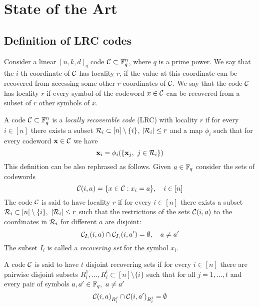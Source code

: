 \chapter{State of the Art}

\section{Definition of LRC codes}

Consider a linear $[n,k,d]_q$ code ${\mathcal C} \subset {\mathbb F}_q^n$, where $q$ is a prime power. We say that the $i$-th coordinate of ${\mathcal C}$ has locality $r$, if the value at this coordinate can be recovered from accessing some other $r$ coordinates of ${\mathcal C}$. We say that the code ${\mathcal C}$ has locality $r$ if every symbol of the codeword $x \in {\mathcal C}$ can be recovered from a subset of $r$ other symbols of $x$.

\begin{defn}
A code ${\mathcal C} \subset {\mathbb F}_q^n$ is a \textit{locally recoverable code} (LRC) with locality $r$ if for every $i \in [n]$ there exists a subset ${\mathcal R}_i \subset [n] \setminus \{i\}$, $\left\vert {{\mathcal R}_i} \right\vert \leq r$ and a map $\phi_i$ such that for every codeword $\mathbf{x} \in {\mathcal C}$ we have
\begin{equation}
\x_i = \phi_i(\{\x_j, \ j \in \R_i \})
\end{equation}
This definition can be also rephrased as follows. Given $a \in {\mathbb F}_q$ consider the sets of codewords
\[{\mathcal C}(i,a) = \{ x \in {\mathcal C} : x_i = a\}, \quad i \in [n]\]
The code ${\mathcal C}$ is said to have locality $r$ if for every $i \in [n]$ there exists a subset ${{\mathcal R}_i \subset [n] \setminus \{i\}}, \ \left\vert {{\mathcal R}_i} \right\vert \leq r$ such that the restrictions of the sets ${\mathcal C}(i,a)$ to the coordinates in ${\mathcal R}_i$ for different $a$ are disjoint:
    \begin{equation}
        {\mathcal C}_{I_i}(i,a) \cap {\mathcal C}_{I_i}(i,a') = \emptyset, \quad a \neq a'
    \end{equation}
The subset $I_i$ is called a \textit{recovering set} for the symbol $x_i$.
\end{defn}

\begin{defn}
A code ${\mathcal C}$ is said to have $t$ disjoint recovering sets if for every $i \in [n]$ there are pairwise disjoint subsets $R_i^1, ..., R_i^t \subset [n] \setminus \{i\}$ such that for all $j =1, ..., t$ and every pair of symbols $a,a' \in {\mathbb F}_q, \ a \neq a'$
\begin{equation}
{\mathcal C}(i,a)_{R_i^j} \cap {\mathcal C}(i,a')_{R_i^j} = \emptyset
\end{equation}

\end{defn}

